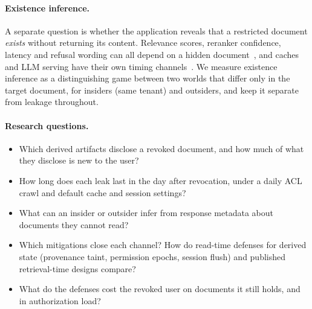 \paragraph{Existence inference.}
A separate question is whether the application reveals that a restricted document \emph{exists}
without returning its content. Relevance scores, reranker confidence, latency and refusal wording
can all depend on a hidden document~\cite{buttcher2005security,gelernter2015xs}, and caches and LLM
serving have their own timing channels~\cite{gu2025auditing,song2025earlybird,zheng2024inputsnatch,carlini2024remote}.
We measure existence inference as a distinguishing game between two worlds that differ only in the
target document, for insiders (same tenant) and outsiders, and keep it separate from leakage
throughout.

\paragraph{Research questions.}
\begin{itemize}
\item[RQ1] Which derived artifacts disclose a revoked document, and how much of what they disclose
is new to the user?
\item[RQ2] How long does each leak last in the day after revocation, under a daily ACL crawl and
default cache and session settings?
\item[RQ3] What can an insider or outsider infer from response metadata about documents they cannot
read?
\item[RQ4] Which mitigations close each channel? How do read-time defenses for derived state
(provenance taint, permission epochs, session flush) and published retrieval-time designs compare?
\item[RQ5] What do the defenses cost the revoked user on documents it still holds, and in
authorization load?
\end{itemize}

